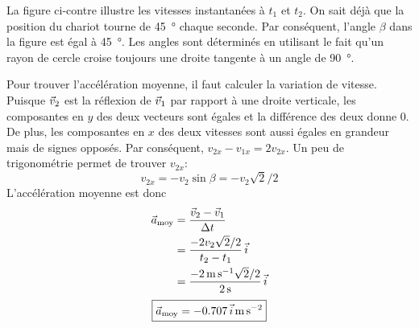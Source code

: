 \documentclass{tufte-handout}
\begin{document}
\begin{enumerate}[a)]
    La figure ci-contre illustre les vitesses instantanées à $t_1$ et $t_2$.
    On sait déjà que la position du chariot tourne de \SI{45}{\degree} chaque
    seconde.  Par conséquent, l'angle $\beta$ dans la figure est égal à
    \SI{45}{\degree}.  Les angles sont déterminés en utilisant le fait qu'un
    rayon de cercle croise toujours une droite tangente à un angle de
    \SI{90}{\degree}.
    \begin{marginfigure}
    \end{marginfigure}

    Pour trouver l'accélération moyenne, il faut calculer la variation de
    vitesse.  Puisque $\vec{v}_2$ est la réflexion de $\vec{v}_1$ par rapport à une
    droite verticale, les composantes en $y$ des deux vecteurs sont égales et
    la différence des deux donne \num{0}.  De plus, les composantes en $x$ des
    deux vitesses sont aussi égales en grandeur mais de signes opposés.  Par
    conséquent, $v_{2x} - v_{1x} = 2v_{2x}$.  Un peu de trigonométrie permet de
    trouver $v_{2x}$:
    \[
      v_{2x} = -v_2 \sin \beta = -v_2 \sqrt{2}/2
    \]
    L'accélération moyenne est donc
    \begin{align*}
      \vec{a}_{\mathrm{moy}} &= \frac{\vec{v}_2 - \vec{v}_1}{\Delta t} \\
                             &= \frac{-2v_2\sqrt{2}/2}{t_2 - t_1}\, \vec{i} \\
                             &=
                             \frac{-\SI{2}{\meter\per\second}\sqrt{2}/2}{\SI{2}{\second}}\, \vec{i} \\
    \end{align*}
    \[
      \boxed{\vec{a}_{\mathrm{moy}} = \num{-0.707}\,\vec{i}\, \si{\meter\per\second\squared}}
    \]


\end{enumerate}
\end{document}
